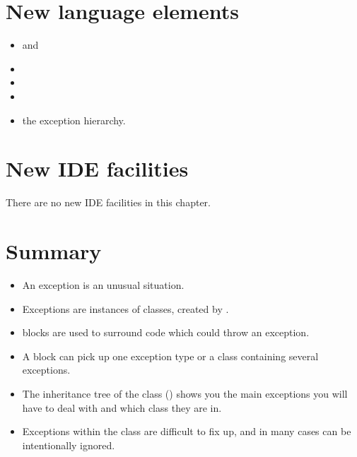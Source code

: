 	\section{New language elements}
		\begin{itemize}
      \item {} and 
      \item {}
      \item {}
      \item {}
      \item the exception hierarchy.
		\end{itemize}


	\section{New IDE facilities}
		There are no new IDE facilities in this chapter.


	\section{Summary}
	\begin{itemize}
      \item An exception is an unusual situation.
			\item Exceptions are instances of classes, created by .
      \item {} blocks are used to surround code which could throw an exception.
      \item A  block can pick up one exception type or a class containing several exceptions.
			\item The inheritance tree of the class  () shows you the main exceptions you will have to deal with and which class they are in.
      \item Exceptions within the  class are difficult to fix up, and in many cases can be intentionally ignored.
	\end{itemize}


